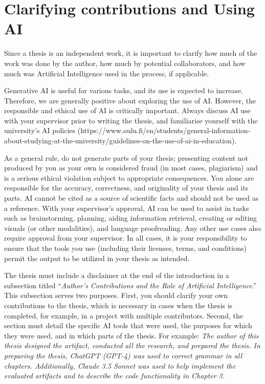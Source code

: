 \section{Clarifying contributions and Using AI}
\label{AI}
Since a thesis is an independent work, it is important to clarify how
much of the work was done by the author, how much by potential
collaborators, and how much was Artificial Intelligence used in the
process, if applicable.

Generative AI is useful for various tasks, and its use is expected to
increase. Therefore, we are generally positive about exploring the
use of AI. However, the responsible and ethical use of AI is
critically important. Always discuss AI use with your supervisor
prior to writing the thesis, and familiarise yourself with the
university's AI policies
(https://www.oulu.fi/en/students/general-information-about-studying-at-the-university/guidelines-on-the-use-of-ai-in-education).

As a general rule, do not generate parts of your thesis; presenting
content not produced by you as your own is considered fraud (in most
cases, plagiarism) and is a serious ethical violation subject to
appropriate consequences. You alone are responsible for the accuracy,
correctness, and originality of your thesis and its parts. AI cannot
be cited as a source of scientific facts and should not be used as a
reference. With your supervisor's approval, AI can be used to assist
in tasks such as brainstorming, planning, aiding information
retrieval, creating or editing visuals (or other modalities), and
language proofreading. Any other use cases also require approval from
your supervisor. In all cases, it is your responsibility to ensure
that the tools you use (including their licenses, terms, and
conditions) permit the output to be utilized in your thesis as intended.

The thesis must include a disclaimer at the end of the introduction
in a subsection titled ``\textit{Author's Contributions and the Role
of Artificial Intelligence}.'' This subsection serves two purposes.
First, you should clarify your own contributions to the thesis, which
is necessary in cases when the thesis is completed, for example, in a
project with multiple contributors. Second, the section must detail
the specific AI tools that were used, the purposes for which they
were used, and in which parts of the thesis. For example: \textit{The
author of this thesis designed the artifact, conducted all the
research, and prepared the thesis. In preparing the thesis, ChatGPT
(GPT-4) was used to correct grammar in all chapters. Additionally,
Claude 3.5 Sonnet was used to help implement the evaluated artifacts
and to describe the code functionality in Chapter 3.}

